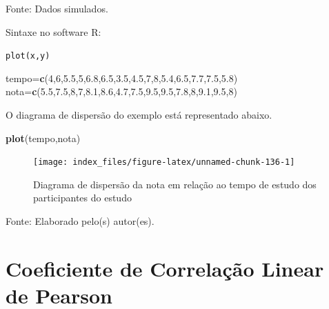 \documentclass[12pt,brazil,oneside]{book}
\newenvironment{Shaded}{\begin{snugshade}}{\end{snugshade}}
\newcommand{\DecValTok}[1]{\textcolor[rgb]{0.00,0.00,0.81}{#1}}
\newcommand{\FloatTok}[1]{\textcolor[rgb]{0.00,0.00,0.81}{#1}}
\newcommand{\KeywordTok}[1]{\textcolor[rgb]{0.13,0.29,0.53}{\textbf{#1}}}
\newcommand{\NormalTok}[1]{#1}
\begin{document}
Fonte: Dados simulados.

Sintaxe no software R:

\texttt{plot(x,y)}

\begin{Shaded}
\begin{Highlighting}[]
\NormalTok{tempo=}\KeywordTok{c}\NormalTok{(}\DecValTok{4}\NormalTok{,}\DecValTok{6}\NormalTok{,}\FloatTok{5.5}\NormalTok{,}\DecValTok{5}\NormalTok{,}\FloatTok{6.8}\NormalTok{,}\FloatTok{6.5}\NormalTok{,}\FloatTok{3.5}\NormalTok{,}\FloatTok{4.5}\NormalTok{,}\DecValTok{7}\NormalTok{,}\DecValTok{8}\NormalTok{,}\FloatTok{5.4}\NormalTok{,}\FloatTok{6.5}\NormalTok{,}\FloatTok{7.7}\NormalTok{,}\FloatTok{7.5}\NormalTok{,}\FloatTok{5.8}\NormalTok{)}
\NormalTok{nota=}\KeywordTok{c}\NormalTok{(}\FloatTok{5.5}\NormalTok{,}\FloatTok{7.5}\NormalTok{,}\DecValTok{8}\NormalTok{,}\DecValTok{7}\NormalTok{,}\FloatTok{8.1}\NormalTok{,}\FloatTok{8.6}\NormalTok{,}\FloatTok{4.7}\NormalTok{,}\FloatTok{7.5}\NormalTok{,}\FloatTok{9.5}\NormalTok{,}\FloatTok{9.5}\NormalTok{,}\FloatTok{7.8}\NormalTok{,}\DecValTok{8}\NormalTok{,}\FloatTok{9.1}\NormalTok{,}\FloatTok{9.5}\NormalTok{,}\DecValTok{8}\NormalTok{)}
\end{Highlighting}
\end{Shaded}

O diagrama de dispersão do exemplo está representado abaixo.

\begin{Shaded}
\begin{Highlighting}[]
\KeywordTok{plot}\NormalTok{(tempo,nota)}
\end{Highlighting}
\end{Shaded}

\begin{figure}[H]

{\centering \texttt{[image: index\_files/figure-latex/unnamed-chunk-136-1]} 

}

\caption{Diagrama de dispersão da nota em relação ao tempo de estudo dos participantes do estudo}\label{fig:unnamed-chunk-136}
\end{figure}

Fonte: Elaborado pelo(s) autor(es).

\hypertarget{coeficiente-de-correlacao-linear-de-pearson}{%
\section{Coeficiente de Correlação Linear de Pearson}\label{coeficiente-de-correlacao-linear-de-pearson}}
\end{document}
